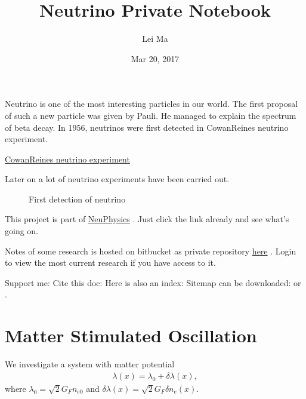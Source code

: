 \documentclass[letterpaper,12pt,english]{sphinxmanual}
\title{Neutrino Private Notebook}
\date{Mar 20, 2017}
\author{Lei Ma}
\begin{document}
\maketitle
\sphinxtableofcontents
{}\label{\detokenize{index::doc}}


Neutrino is one of the most interesting particles in our world. The first proposal of such a new particle was given by Pauli. He managed to explain the spectrum of beta decay. In 1956, neutrinos were first detected in Cowan\textendash{}Reines neutrino experiment. %
\begin{footnote}[1]\sphinxAtStartFootnote
\href{https://en.wikipedia.org/wiki/Cowan\%E2\%80\%93Reines\_neutrino\_experiment}{Cowan\textendash{}Reines neutrino experiment}
%
\end{footnote} Later on a lot of neutrino experiments have been carried out.
\begin{figure}[htbp]
\centering
\capstart

\noindent{}
\caption{First detection of neutrino}\label{\detokenize{index:id3}}\end{figure}

This project is part of \href{http://neutrino.xyz}{NeuPhysics} . Just click the link already and see what's going on.

Notes of some research is hosted on bitbucket as private repository \href{https://bitbucket.org/neuphysics/neutrino-reseaching}{here} . Login to view the most current research if you have access to it.

Support me:
\href{https://gratipay.com/~emptymalei/}{}
Cite this doc:
\href{https://zenodo.org/record/167903}{}
Here is also an index:
Sitemap can be downloaded:  or  .


\chapter{Matter Stimulated Oscillation}
\label{\detokenize{matter-stimulated/index:neutrino-physics}}\label{\detokenize{matter-stimulated/index::doc}}\label{\detokenize{matter-stimulated/index:matter-stimulated-oscillation}}
We investigate a system with matter potential
\begin{equation*}
\begin{split}\lambda(x) = \lambda_0 + \delta \lambda (x),\end{split}
\end{equation*}
where \(\lambda_0 = \sqrt{2}G_F n_{e0}\) and \(\delta \lambda(x) = \sqrt{2}G_F \delta n_e(x)\).
\end{document}
